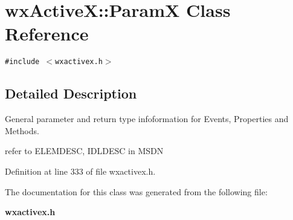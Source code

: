 \section{wx\-Active\-X::Param\-X Class Reference}
\label{classwxActiveX_1_1ParamX}
{\tt \#include $<$wxactivex.h$>$}



\subsection{Detailed Description}
General parameter and return type infoformation for Events, Properties and Methods.

refer to ELEMDESC, IDLDESC in MSDN 



Definition at line 333 of file wxactivex.h.

The documentation for this class was generated from the following file:\begin{CompactItemize}
\item 
{\bf wxactivex.h}\end{CompactItemize}
